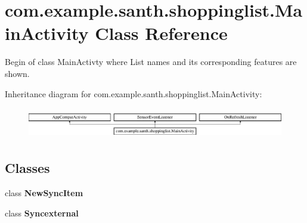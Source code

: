 \hypertarget{classcom_1_1example_1_1santh_1_1shoppinglist_1_1_main_activity}{}\section{com.\+example.\+santh.\+shoppinglist.\+Main\+Activity Class Reference}
\label{classcom_1_1example_1_1santh_1_1shoppinglist_1_1_main_activity}


Begin of class Main\+Activty where List names and its corresponding features are shown.  


Inheritance diagram for com.\+example.\+santh.\+shoppinglist.\+Main\+Activity\+:\begin{figure}[H]
\begin{center}
\leavevmode
\includegraphics[height=1.377614cm]{classcom_1_1example_1_1santh_1_1shoppinglist_1_1_main_activity}
\end{center}
\end{figure}
\subsection*{Classes}
\begin{DoxyCompactItemize}
\item 
class {\bfseries New\+Sync\+Item}
\item 
class {\bfseries Syncexternal}
\end{DoxyCompactItemize}
